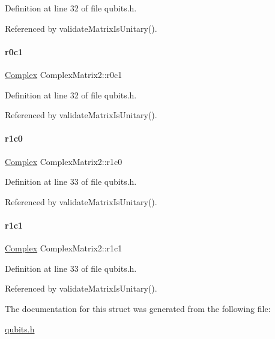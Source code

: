 Definition at line 32 of file qubits.\+h.



Referenced by validate\+Matrix\+Is\+Unitary().

\mbox{\label{structComplexMatrix2_a0f3932f055a8b05cef361bce25d51172}} 
\paragraph{\texorpdfstring{r0c1}{r0c1}}
{\footnotesize\ttfamily \mbox{\hyperlink{structComplex}{Complex}} Complex\+Matrix2\+::r0c1}



Definition at line 32 of file qubits.\+h.



Referenced by validate\+Matrix\+Is\+Unitary().

\mbox{\label{structComplexMatrix2_ab98282015ed2065e53fbc9638e2583ab}} 
\paragraph{\texorpdfstring{r1c0}{r1c0}}
{\footnotesize\ttfamily \mbox{\hyperlink{structComplex}{Complex}} Complex\+Matrix2\+::r1c0}



Definition at line 33 of file qubits.\+h.



Referenced by validate\+Matrix\+Is\+Unitary().

\mbox{\label{structComplexMatrix2_a763007c3070802373549ba0350f83c8a}} 
\paragraph{\texorpdfstring{r1c1}{r1c1}}
{\footnotesize\ttfamily \mbox{\hyperlink{structComplex}{Complex}} Complex\+Matrix2\+::r1c1}



Definition at line 33 of file qubits.\+h.



Referenced by validate\+Matrix\+Is\+Unitary().



The documentation for this struct was generated from the following file\+:\begin{DoxyCompactItemize}
\item 
\mbox{\hyperlink{qubits_8h}{qubits.\+h}}\end{DoxyCompactItemize}
